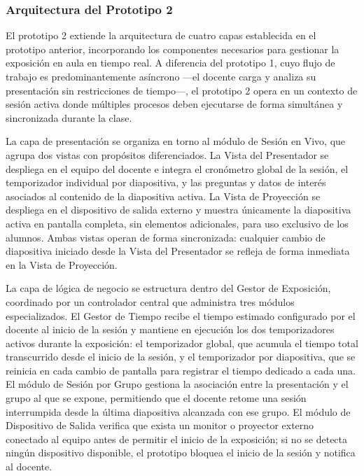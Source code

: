 \documentclass[11pt]{article}
\newif\ifshowttiimarks
\newcommand{\ttiiTOC}[1]{%
  \ifshowttiimarks
    \texorpdfstring{\textcolor{ttiipurple}{\textbf{#1}}}{#1}%
  \else
    #1%
  \fi
}
\begin{document}
\subsubsection*{Arquitectura del Prototipo 2}
\addcontentsline{toc}{subsubsection}{\protect\ttiiTOC{Arquitectura del Prototipo 2}}

El prototipo 2 extiende la arquitectura de cuatro capas establecida en el prototipo anterior, incorporando los componentes necesarios para gestionar la exposición en aula en tiempo real. A diferencia del prototipo 1, cuyo flujo de trabajo es predominantemente asíncrono —el docente carga y analiza su presentación sin restricciones de tiempo—, el prototipo 2 opera en un contexto de sesión activa donde múltiples procesos deben ejecutarse de forma simultánea y sincronizada durante la clase.

La capa de presentación se organiza en torno al módulo de Sesión en Vivo, que agrupa dos vistas con propósitos diferenciados. La Vista del Presentador se despliega en el equipo del docente e integra el cronómetro global de la sesión, el temporizador individual por diapositiva, y las preguntas y datos de interés asociados al contenido de la diapositiva activa. La Vista de Proyección se despliega en el dispositivo de salida externo y muestra únicamente la diapositiva activa en pantalla completa, sin elementos adicionales, para uso exclusivo de los alumnos. Ambas vistas operan de forma sincronizada: cualquier cambio de diapositiva iniciado desde la Vista del Presentador se refleja de forma inmediata en la Vista de Proyección.

La capa de lógica de negocio se estructura dentro del Gestor de Exposición, coordinado por un controlador central que administra tres módulos especializados. El Gestor de Tiempo recibe el tiempo estimado configurado por el docente al inicio de la sesión y mantiene en ejecución los dos temporizadores activos durante la exposición: el temporizador global, que acumula el tiempo total transcurrido desde el inicio de la sesión, y el temporizador por diapositiva, que se reinicia en cada cambio de pantalla para registrar el tiempo dedicado a cada una. El módulo de Sesión por Grupo gestiona la asociación entre la presentación y el grupo al que se expone, permitiendo que el docente retome una sesión interrumpida desde la última diapositiva alcanzada con ese grupo. El módulo de Dispositivo de Salida verifica que exista un monitor o proyector externo conectado al equipo antes de permitir el inicio de la exposición; si no se detecta ningún dispositivo disponible, el prototipo bloquea el inicio de la sesión y notifica al docente.
\end{document}
